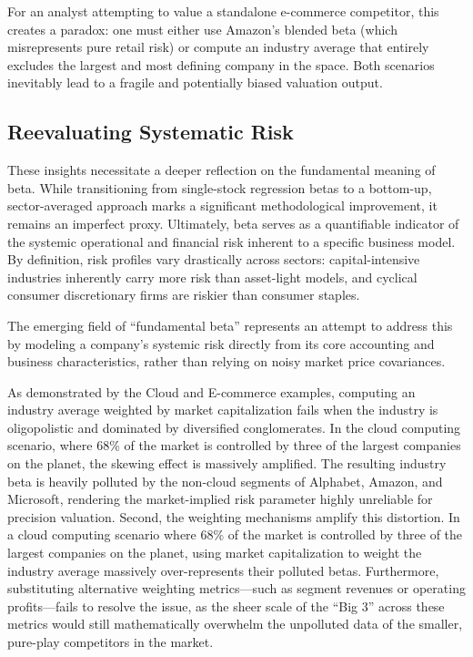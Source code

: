 For an analyst attempting to value a standalone e-commerce competitor, this creates a paradox: one must either use Amazon's blended beta (which misrepresents pure retail risk) or compute an industry average that entirely excludes the largest and most defining company in the space. Both scenarios inevitably lead to a fragile and potentially biased valuation output.

\subsection*{Reevaluating Systematic Risk}

These insights necessitate a deeper reflection on the fundamental meaning of beta. While transitioning from single-stock regression betas to a bottom-up, sector-averaged approach marks a significant methodological improvement, it remains an imperfect proxy. Ultimately, beta serves as a quantifiable indicator of the systemic operational and financial risk inherent to a specific business model. By definition, risk profiles vary drastically across sectors: capital-intensive industries inherently carry more risk than asset-light models, and cyclical consumer discretionary firms are riskier than consumer staples.

The emerging field of ``fundamental beta'' represents an attempt to address this by modeling a company's systemic risk directly from its core accounting and business characteristics, rather than relying on noisy market price covariances.

As demonstrated by the Cloud and E-commerce examples, computing an industry average weighted by market capitalization fails when the industry is oligopolistic and dominated by diversified conglomerates. In the cloud computing scenario, where 68\% of the market is controlled by three of the largest companies on the planet, the skewing effect is massively amplified. The resulting industry beta is heavily polluted by the non-cloud segments of Alphabet, Amazon, and Microsoft, rendering the market-implied risk parameter highly unreliable for precision valuation. Second, the weighting mechanisms amplify this distortion. In a cloud computing scenario where 68\% of the market is controlled by three of the largest companies on the planet, using market capitalization to weight the industry average massively over-represents their polluted betas. Furthermore, substituting alternative weighting metrics—such as segment revenues or operating profits—fails to resolve the issue, as the sheer scale of the ``Big 3'' across these metrics would still mathematically overwhelm the unpolluted data of the smaller, pure-play competitors in the market.

